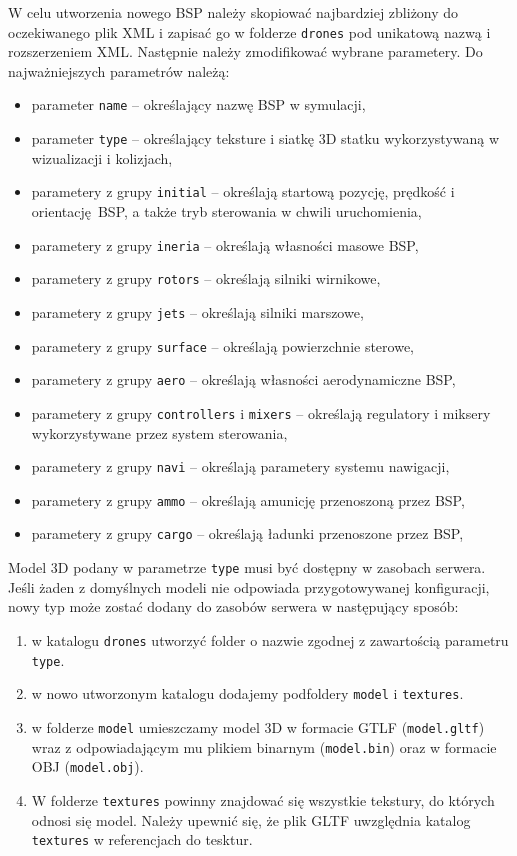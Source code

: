 \documentclass[15pt]{sprawozdanie}
\begin{document}
W celu utworzenia nowego BSP należy skopiować najbardziej zbliżony do oczekiwanego plik XML i zapisać go w folderze \texttt{drones} pod unikatową nazwą i rozszerzeniem XML. Następnie należy zmodifikować wybrane parametery. Do najważniejszych parametrów należą:

 \begin{itemize}[noitemsep]
\item parameter \texttt{name} -- określający nazwę BSP w symulacji,
\item parameter \texttt{type} -- określający teksture i siatkę 3D statku wykorzystywaną w wizualizacji i kolizjach,
\item parametery z grupy \texttt{initial} -- określają startową pozycję, prędkość i orientację BSP, a także tryb sterowania w chwili uruchomienia,
\item parametery z grupy \texttt{ineria} -- określają własności masowe BSP,
\item parametery z grupy \texttt{rotors} -- określają silniki wirnikowe,
\item parametery z grupy \texttt{jets} -- określają silniki marszowe,
\item parametery z grupy \texttt{surface} -- określają powierzchnie sterowe,
\item parametery z grupy \texttt{aero} -- określają własności aerodynamiczne BSP,
\item parametery z grupy \texttt{controllers} i \texttt{mixers} -- określają regulatory i miksery wykorzystywane przez system sterowania,
\item parametery z grupy \texttt{navi} -- określają parametery systemu nawigacji,
\item parametery z grupy \texttt{ammo} -- określają amunicję przenoszoną przez BSP,
\item parametery z grupy \texttt{cargo} -- określają ładunki przenoszone przez BSP,
\end{itemize}

Model 3D podany w parametrze \texttt{type} musi być dostępny w zasobach serwera. Jeśli żaden z domyślnych modeli nie odpowiada przygotowywanej konfiguracji, nowy typ może zostać dodany do zasobów serwera w następujący sposób:

\begin{enumerate}
	\item w katalogu \texttt{drones} utworzyć folder o nazwie zgodnej z zawartością parametru \texttt{type}.
	\item w nowo utworzonym katalogu dodajemy podfoldery \texttt{model} i \texttt{textures}.
	\item w folderze \texttt{model} umieszczamy model 3D w formacie GTLF (\texttt{model.gltf}) wraz z odpowiadającym mu plikiem binarnym (\texttt{model.bin}) oraz w formacie OBJ (\texttt{model.obj}).
	\item W folderze \texttt{textures} powinny znajdować się wszystkie tekstury, do których odnosi się model. Należy upewnić się, że plik GLTF uwzględnia katalog \texttt{textures} w referencjach do tesktur.
\end{enumerate}
\end{document}
